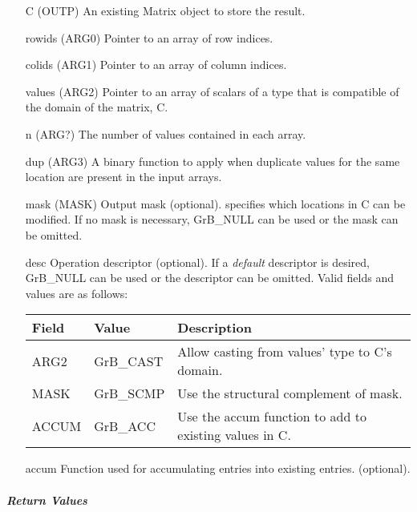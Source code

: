 \begin{itemize}[leftmargin=1.1in]
    \item[{\sf C}]      ({\sf OUTP}) An existing Matrix object to store the result.
	\item[{\sf rowids}] ({\sf ARG0}) Pointer to an array of row indices. 
	\item[{\sf colids}] ({\sf ARG1}) Pointer to an array of column indices. 
	\item[{\sf values}] ({\sf ARG2}) Pointer to an array of scalars of a type that
                                     is compatible of the domain of the matrix, {\sf C}.
    \item[{\sf n}]      ({\sf ARG?}) The number of values contained in each array.
    \item[{\sf dup}]    ({\sf ARG3}) A binary function to apply when duplicate values for
                                     the same location are present in the input arrays.
                                     
    \item[{\sf mask}]   ({\sf MASK}) Output mask (optional). specifies which locations in
                        {\sf C} can be modified.  If no mask is necessary,
	                    {\sf GrB\_NULL} can be used or the mask can be omitted.
    \item[{\sf desc}]   Operation descriptor (optional). If a
	\emph{default} descriptor is desired, {\sf GrB\_NULL} can be
	used or the descriptor can be omitted.  Valid fields and values are as follows: \\
    \begin{tabular}{lll}
    Field  & Value & Description \\
    \hline
    {\sf ARG2} & {\sf GrB\_CAST} & Allow casting from {\sf values}' type to {\sf C}'s domain. \\
    {\sf MASK} & {\sf GrB\_SCMP} & Use the structural complement of {\sf mask}. \\
    {\sf ACCUM}& {\sf GrB\_ACC}  & Use the {\sf accum} function to add to existing values in {\sf C}.\\
    \end{tabular}
	\item[{\sf accum}]  Function used for accumulating entries into existing  entries. (optional). 
\end{itemize}

\subparagraph{Return Values}

